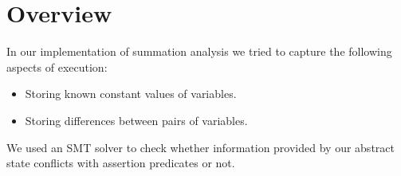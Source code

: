 \section*{Overview}
In our implementation of summation analysis we tried to capture the following aspects of execution:
\begin{itemize}
	\item Storing known constant values of variables.
	\item Storing differences between pairs of variables.
\end{itemize}
We used an SMT solver to check whether information provided by our abstract state conflicts with assertion predicates or not.